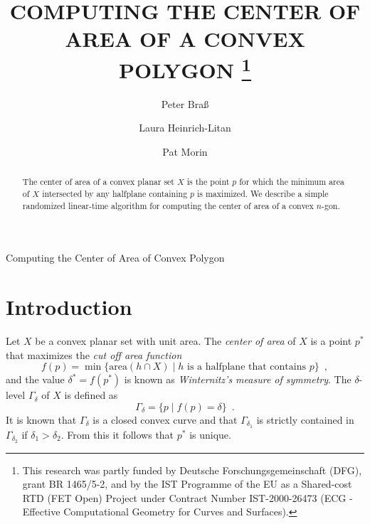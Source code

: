 \documentclass{ws-ijcga}
\newcommand{\area}{\mathrm{area}}
\begin{document}
{Computing the Center of Area of Convex Polygon}

\catchline

\title{\MakeUppercase{Computing the Center of Area of a Convex Polygon}%
  \thanks{This research was partly funded by Deutsche 
    Forschungsgemeinschaft (DFG), grant BR 1465/5-2, and by
    the IST Programme of the EU as a Shared-cost RTD (FET Open) 
    Project under Contract Number IST-2000-26473 (ECG - Effective 
    Computational Geometry for Curves and Surfaces).}}

\author{Peter Bra\ss}
\address{Department of Computer Science R8/206, City College CUNY,
    138th Street at Convent Ave. \\
    New York NY 10031, USA \\
    peter@cs.ccny.cuny.edu} 

\author{Laura Heinrich-Litan}
\address{Institut f\"ur Informatik, Freie Universit\"at Berlin \\
    D-14195 Berlin, Germany \\ 
    litan@inf.fu-berlin.de}

\author{Pat Morin}
\address{School of Computer Science, Carleton University,
    1125 Colonel By Drive \\ 
    Ottawa, Ontario, K1S~5B6, Canada \\
    morin@cs.carleton.ca}

\maketitle


\begin{abstract}
The center of area of a convex planar set $X$ is the point $p$ for
which the minimum area of $X$ intersected by any halfplane containing
$p$ is maximized.  We describe a simple randomized linear-time
algorithm for computing the center of area of a convex $n$-gon.
\end{abstract}


\section{Introduction}
Let $X$ be a convex planar set with unit area.  The \emph{center of
area} of $X$ is a point $p^*$ that maximizes the \emph{cut off area
function}
\[
f(p) = \min\{\area(h\cap X) \mid \mbox{$h$ is a halfplane that contains $p$} \}
	\enspace ,
\]
and the value $\delta^*=f(p^*)$ is known as \emph{Winternitz's measure of
symmetry}.\cite{g63} The $\delta$-level $\Gamma_\delta$ of $X$ is
defined as
\[
\Gamma_\delta = \{p \mid f(p)=\delta  \} \enspace .
\]
It is known that $\Gamma_\delta$ is a closed convex curve and
that $\Gamma_{\delta_1}$ is strictly contained in $\Gamma_{\delta_2}$
if $\delta_1>\delta_2$.  From this it follows that $p^*$ is unique.
\end{document}
